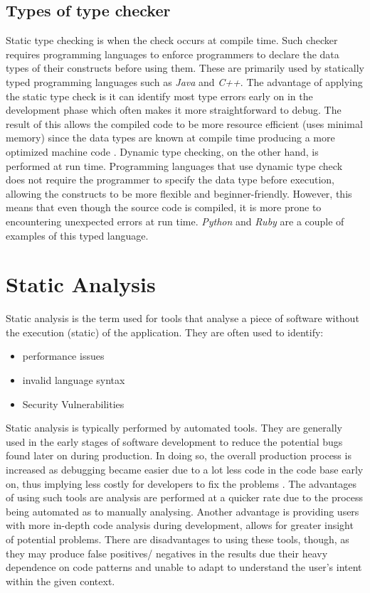 \documentclass{l4proj}
\begin{document}
\subsection{Types of type checker}
Static type checking is when the check occurs at compile time. Such checker requires programming languages to enforce programmers to declare the data types of their constructs before using them. These are primarily used by statically typed programming languages such as \emph{Java} and \emph{C++}. The advantage of applying the static type check is it can identify most type errors early on in the development phase which often makes it more straightforward to debug. The result of this allows the compiled code to be more resource efficient (uses minimal memory) since the data types are known at compile time producing a more optimized machine code \cite{S/D_checking}. Dynamic type checking, on the other hand, is performed at run time. Programming languages that use dynamic type check does not require the programmer to specify the data type before execution, allowing the constructs to be more flexible and beginner-friendly. However, this means that even though the source code is compiled, it is more prone to encountering unexpected errors at run time. \emph{Python} and \emph{Ruby} are a couple of examples of this typed language.

\section{Static Analysis}
Static analysis is the term used for tools that analyse a piece of software without the execution (static) of the application. They are often used to identify:

\begin{itemize}
    \item performance issues
    \item invalid language syntax
    \item Security Vulnerabilities
\end{itemize}

Static analysis is typically performed by automated tools. They are generally used in the early stages of software development to reduce the potential bugs found later on during production. In doing so, the overall production process is increased as debugging became easier due to a lot less code in the code base early on, thus implying less costly for developers to fix the problems \cite{stat2}. The advantages of using such tools are analysis are performed at a quicker rate due to the process being automated as to manually analysing. Another advantage is providing users with more in-depth code analysis during development, allows for greater insight of potential problems. There are disadvantages to using these tools, though, as they may produce false positives/ negatives in the results due their heavy dependence on code patterns and unable to adapt to understand the user's intent within the given context. 
\end{document}
